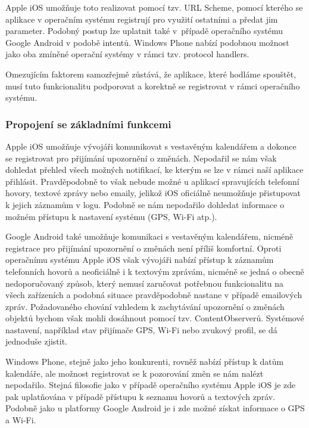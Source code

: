 \documentclass[thesis=M,czech]{FITthesis}[2012/06/26]
\begin{document}
Apple iOS umožňuje toto realizovat pomocí tzv. URL Scheme\cite{apple_url_scheme}, pomocí kterého se aplikace v operačním systému registrují pro využití ostatními \cite{apple_app_launch} a předat jim parameter\cite{apple_app_launch2}. Podobný postup lze uplatnit také v~případě operačního systému Google Android v podobě intentů\cite{android_app_launch}. Windows Phone nabízí podobnou možnost jako oba zmíněné operační systémy v rámci tzv. protocol handlers\cite{win_app_launch}.

Omezujícím faktorem samozřejmě zůstává, že aplikace, které hodláme spouštět, musí tuto funkcionalitu podporovat a korektně se registrovat v rámci operačního systému.

\subsubsection*{Propojení se základními funkcemi}
Apple iOS umožňuje vývojáři komunikovat s vestavěným kalendářem a dokonce se registrovat pro přijímání upozornění o změnách\cite{apple_listener}. Nepodařil se nám však dohledat přehled všech možných notifikací, ke kterým se lze v rámci naší aplikace přihlásit. Pravděpodobně to však nebude možné u aplikací spravujících telefonní hovory, textové zprávy nebo emaily, jelikož iOS oficiálně neumožňuje přistupovat k jejich záznamům v logu\cite{apple_history}. Podobně se nám nepodařilo dohledat informace o možném přístupu k nastavení systému (GPS, Wi-Fi atp.).

Google Android také umožňuje komunikaci s vestavěným kalendářem\cite{android_calendar}\cite{android_calendar2}, nicméně registrace pro přijímání upozornění o změnách není příliš komfortní\cite{android_calendar3}\cite{android_calendar4}. Oproti operačnímu systému Apple iOS však vývojáři nabízí přístup k záznamům telefonních hovorů\cite{android_calllog} a neoficiálně i k textovým zprávám, nicméně se jedná o obecně nedoporučovaný způsob, který nemusí zaručovat potřebnou funkcionalitu na všech zařízeních\cite{android_sms} a podobná situace pravděpodobně nastane v případě emailových zpráv. Požadovaného chování vzhledem k zachytávání upozornění o změnách objektů bychom však mohli dosáhnout pomocí tzv. ContentObserverů\cite{android_observer}. Systémové nastavení, například stav přijímače GPS\cite{android_gps}, Wi-Fi\cite{android_wifi} nebo zvukový profil\cite{android_profile}, se dá jednoduše zjistit.

Windows Phone, stejně jako jeho konkurenti, rovněž nabízí přístup k datům kalendáře\cite{win_calendar}, ale možnost registrovat se k pozorování změn se nám nalézt nepodařilo. Stejná filosofie jako v případě operačního systému Apple iOS je zde pak uplatňována v případě přístupu k seznamu hovorů a textových zpráv\cite{win_incoming_event}. Podobně jako u platformy Google Android je i zde možné získat informace o GPS\cite{win_location} a Wi-Fi\cite{win_wifi}.
\end{document}
